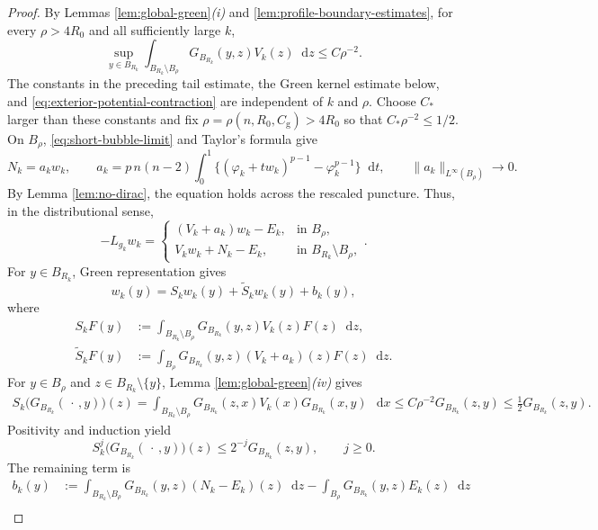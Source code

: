 \documentclass[11pt]{article}
\numberwithin{equation}{section}
\theoremstyle{remark}
\newcommand{\dd}{\mathop{}\!\mathrm{d}}
\begin{document}
\begin{proof}
By  Lemmas  \ref{lem:global-green}\emph{(i)} and
\ref{lem:profile-boundary-estimates}, for every $\rho>4R_0$ and all
sufficiently large $k$,
{
\[
 \sup_{y\in B_{R_k}}
 \int_{B_{R_k}\setminus B_\rho}
 G_{B_{R_k}}(y,z)V_k(z)\dd z
 \le C\rho^{-2}.
\]
}
The constants in the preceding tail estimate, the Green kernel estimate
below, and \eqref{eq:exterior-potential-contraction} are independent of
\(k\) and \(\rho\). Choose \(C_*\) larger than these constants and fix
$\rho=\rho(n,R_0,C_{\mathrm g})>4R_0$ so that
$C_*\rho^{-2}\le1/2$.
 On $B_\rho$, \eqref{eq:short-bubble-limit} and Taylor's formula give
{
\[
 N_k=a_kw_k,\qquad
 a_k=p\,n(n-2)\int_0^1
 \big\{(\varphi_k+tw_k)^{p-1}-\varphi_k^{p-1}\big\}\dd t,
 \qquad \|a_k\|_{L^\infty(B_\rho)}\to0.
\]
}
 By Lemma  \ref{lem:no-dirac}, the equation holds across the
rescaled puncture. Thus, in the distributional sense,
{
\[
 -L_{g_k}w_k=
 \begin{cases}
  (V_k+a_k)w_k-E_k,&\text{in }B_\rho,\\
  V_kw_k+N_k-E_k,&\text{in }B_{R_k}\setminus B_\rho,
 \end{cases}.
\]
}
For $y\in B_{R_k}$, Green representation gives
{
\begin{equation}\label{eq:basic-green-decomposition}
 w_k(y)=S_kw_k(y)+\widetilde S_kw_k(y)+b_k(y),
\end{equation}
}
where
{
\[
 \begin{aligned}
 S_kF(y)&:=\int_{B_{R_k}\setminus B_\rho}
 G_{B_{R_k}}(y,z)V_k(z)F(z)\dd z,\\
 \widetilde S_kF(y)&:=\int_{B_\rho}
 G_{B_{R_k}}(y,z)(V_k+a_k)(z)F(z)\dd z.
 \end{aligned}
\]
}
For \(y\in B_\rho\) and \(z\in B_{R_k}\setminus\{y\}\),
Lemma  \ref{lem:global-green}\emph{(iv)} gives
\[
\begin{aligned}
 S_k\bigl(G_{B_{R_k}}(\,\cdot\,,y)\bigr)(z)
 =\int_{B_{R_k}\setminus B_\rho}
 G_{B_{R_k}}(z,x)V_k(x)G_{B_{R_k}}(x,y)\,\dd x
 \le C\rho^{-2}G_{B_{R_k}}(z,y)
 \le\frac12G_{B_{R_k}}(z,y).
\end{aligned}
\]
Positivity and induction yield
\[
 S_k^j\bigl(G_{B_{R_k}}(\,\cdot\,,y)\bigr)(z)
 \le2^{-j}G_{B_{R_k}}(z,y),\qquad j\ge0.
\]
The remaining term is
{
\begin{equation}\label{eq:bk-green-forcing}
 \begin{aligned}
 b_k(y)&:=\int_{B_{R_k}\setminus B_\rho}
 G_{B_{R_k}}(y,z)(N_k-E_k)(z)\dd z
 -\int_{B_\rho}G_{B_{R_k}}(y,z)E_k(z)\dd z\\

\end{aligned}
\end{equation}}
\end{proof}
\end{document}
